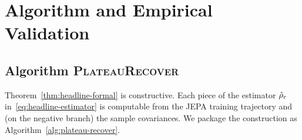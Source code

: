 \section{Algorithm and Empirical Validation}

\subsection{Algorithm \textsc{PlateauRecover}}
\label{sec:algorithm}

Theorem~\ref{thm:headline-formal} is constructive. Each piece of the
estimator $\hat{\rho}_r$ in~\eqref{eq:headline-estimator} is computable from
the JEPA training trajectory and (on the negative branch) the
sample covariances.
We package the construction as Algorithm~\ref{alg:plateau-recover}.

\begin{figure}[tp]
\centering
{}
\end{figure}
